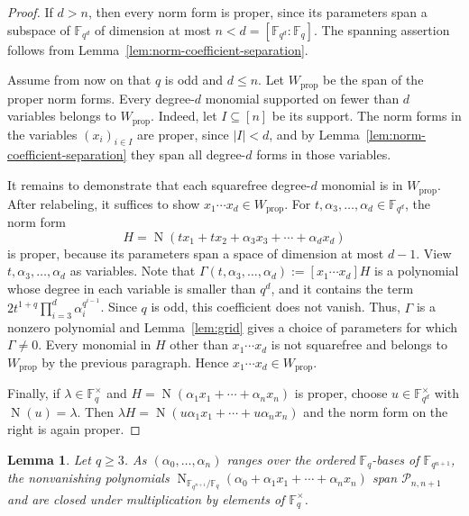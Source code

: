 \documentclass[12pt,reqno]{amsart}
\newtheorem{lem}[thm]{Lemma}
\theoremstyle{definition}
\newcommand{\Nm}{\operatorname{N}}
\newcommand{\F}{\mathbb{F}}
\newcommand{\cP}{\mathcal P}
\begin{document}
\begin{proof}
If $d>n$, then every norm form is proper, since its parameters span a subspace of $\F_{q^d}$ of dimension at most $n<d=[\F_{q^d}:\F_q]$. The spanning assertion follows from Lemma~\ref{lem:norm-coefficient-separation}.

Assume from now on that $q$ is odd and $d\leq n$. Let $W_{\mathrm{prop}}$ be the span of the proper norm forms. Every degree-$d$ monomial supported on fewer than $d$ variables belongs to $W_{\mathrm{prop}}$. Indeed, let $I\subseteq[n]$ be its support. The norm forms in the variables $(x_i)_{i\in I}$ are proper, since $|I|<d$, and by Lemma~\ref{lem:norm-coefficient-separation} they span all degree-$d$ forms in those variables.

It remains to demonstrate that each squarefree degree-$d$ monomial is in $W_{\mathrm{prop}}$. After
relabeling, it suffices to show $x_1\cdots x_d \in W_{\mathrm{prop}}$. For
$t,\alpha_3,\ldots,\alpha_d\in \F_{q^d}$, the norm form
\[
H=\Nm(tx_1+tx_2+\alpha_3x_3+\cdots+\alpha_dx_d)
\]
is proper, because its parameters span a space of dimension at most $d-1$. View $t,\alpha_3,\ldots,\alpha_d$ as variables. Note that $\Gamma(t,\alpha_3,\ldots,\alpha_d):=[x_1\cdots x_d] H$ is a polynomial whose degree in each variable is smaller than $q^d$, and it contains the term $2t^{1+q}\prod_{i=3}^d\alpha_i^{q^{i-1}}$. Since $q$ is odd, this coefficient does not vanish. Thus, $\Gamma$ is a nonzero polynomial and Lemma~\ref{lem:grid} gives a choice of parameters for which $\Gamma\neq0$. Every monomial in $H$ other than $x_1\cdots x_d$ is not squarefree and belongs to $W_{\mathrm{prop}}$ by the previous paragraph. Hence $x_1\cdots x_d\in W_{\mathrm{prop}}$. 

Finally, if $\lambda\in\F_q^\times$ and
$H=\Nm(\alpha_1x_1+\cdots+\alpha_nx_n)$ is proper, choose
$u\in \F_{q^d}^\times$ with $\Nm(u)=\lambda$. Then $\lambda H=\Nm(u\alpha_1x_1+\cdots+u\alpha_nx_n)$ and the norm form on the right is again proper.
\end{proof}

\begin{lem}\label{lem:affine-basis-norm-span}
Let $q\geq 3$. As $(\alpha_0,\ldots,\alpha_n)$ ranges over the ordered
$\F_q$-bases of $\F_{q^{n+1}}$, the nonvanishing polynomials $\Nm_{\F_{q^{n+1}}/\F_q}(\alpha_0+\alpha_1x_1+\cdots+\alpha_nx_n)$ span $\cP_{n,n+1}$ and are closed under multiplication by elements of
$\F_q^\times$.
\end{lem}
\end{document}
